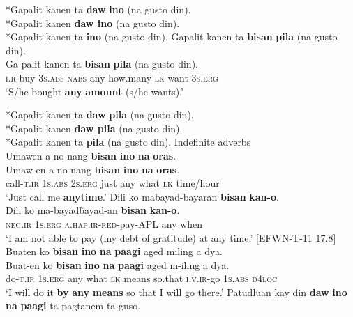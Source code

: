 *Gapalit kanen ta \textbf{daw} \textbf{ino} (na gusto din). \\
*Gapalit kanen \textbf{daw ino} (na gusto din). \\
*Gapalit kanen ta \textbf{ino} (na gusto din).
\z
\ea
Gapalit  kanen  ta  \textbf{bisan}  \textbf{pila}  (na  gusto  din). \\\smallskip
 \gll Ga-palit  kanen  ta  \textbf{bisan}  \textbf{pila}  (na  gusto  din). \\
\textsc{i.r}-buy  3\textsc{s.abs}  \textsc{nabs}  any  how.many  \textsc{lk}  want  3\textsc{s.erg} \\
\glt ‘S/he bought \textbf{any} \textbf{amount} (s/he wants).’ \\\smallskip

*Gapalit kanen ta \textbf{daw} \textbf{pila} (na gusto din). \\
*Gapalit kanen \textbf{daw pila} (na gusto din). \\
*Gapalit kanen ta \textbf{pila} (na gusto din).
\z
\ea
Indefinite adverbs \\
Umawen  a  no  nang  \textbf{bisan}  \textbf{ino}  \textbf{na}  \textbf{oras}. \\\smallskip
 \gll Umaw-en  a  no  nang  \textbf{bisan}  \textbf{ino}  \textbf{na}  \textbf{oras}. \\
call\textsc{-t.ir}  1\textsc{s.abs}  2\textsc{s.erg}  just  any  what  \textsc{lk}  time/hour \\
\glt ‘Just call me \textbf{anytime}.’
\z
\ea
Dili	ko	mabayad-bayaran	\textbf{bisan}	\textbf{kan-o}. \\\smallskip
 \gll Dili	ko	ma-bayad\~bayad-an	\textbf{bisan}	\textbf{kan-o}. \\
\textsc{neg.ir}	1\textsc{s.erg}	\textsc{a.hap.ir-red}-pay-\textsc{APL}	any	when \\
\glt ‘I am not able to pay (my debt of gratitude) at any time.’ [EFWN-T-11 17.8] 
\z
\ea
Buaten  ko  \textbf{bisan}  \textbf{ino}  \textbf{na}  \textbf{paagi}  aged  miling  a  dya. \\\smallskip
 \gll Buat-en  ko  \textbf{bisan}  \textbf{ino}  \textbf{na}  \textbf{paagi}  aged  m-iling  a  dya. \\
do\textsc{-t.ir}  1\textsc{s.erg}  any  what  \textsc{lk}  means  so.that  \textsc{i.v.ir-}go  1\textsc{s.abs}  \textsc{d4loc} \\
\glt ‘I will do it \textbf{by} \textbf{any} \textbf{means} so that I will go there.’
\z
\ea
Patudluan  kay  din  \textbf{daw}  \textbf{ino}  \textbf{na}  \textbf{paagi} ta  pagtanem  ta  guso. \\\smallskip
